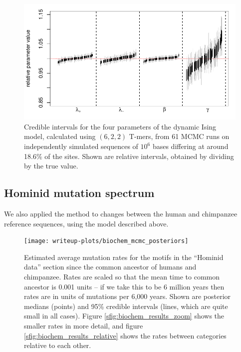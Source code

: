 \documentclass{article}
\theoremstyle{plain}
\theoremstyle{definition}
\begin{document}
\begin{figure}
    \begin{center}
        \includegraphics{writeup-plots/coverage_results}
    \end{center}
    \caption{
        Credible intervals for the four parameters of the dynamic Ising model,
        calculated using $(6,2,2)$ T-mers,
        from 61 MCMC runs on independently simulated sequences of $10^6$ bases
        differing at around 18.6\% of the sites.
        Shown are relative intervals, obtained by dividing by the true value.
        \label{fig:ising_coverage}}
\end{figure}


\subsection{Hominid mutation spectrum}

We also applied the method to changes between the human and chimpanzee reference sequences,
using the model described above.


\begin{figure}
    \begin{center}
        \texttt{[image: writeup-plots/biochem\_mcmc\_posteriors]}
    \end{center}
    \caption{
        Estimated average mutation rates
        for the motifs in the ``Hominid data'' section
        since the common ancestor of humans and chimpanzee.
        Rates are scaled so that the mean time to common ancestor is 0.001 units --
        if we take this to be 6 million years \citep{scally2012insights,langergraber2012generation}
        then rates are in units of mutations per 6,000 years.
        Shown are posterior medians (points) and 95\% credible intervals (lines, which are quite small in all cases).
        Figure \ref{sfig:biochem_results_zoom} shows the smaller rates in more detail,
        and figure \ref{sfig:biochem_results_relative} shows the rates between categories relative to each other.
        \label{fig:biochem_results}}
\end{figure}
\end{document}
